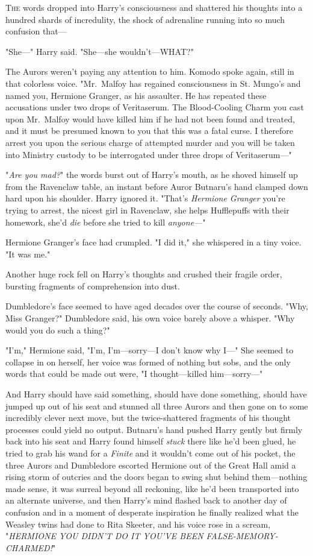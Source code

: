 
\lettrine{T}{he} words dropped into Harry's consciousness and shattered his thoughts into a 
hundred shards of incredulity, the shock of adrenaline running into so much 
confusion that---

"She---" Harry said. "She---she wouldn't---WHAT?"

The Aurors weren't paying any attention to him. Komodo spoke again, still in 
that colorless voice. "Mr.~Malfoy has regained consciousness in St. Mungo's and 
named you, Hermione Granger, as his assaulter. He has repeated these 
accusations under two drops of Veritaserum. The Blood-Cooling Charm you cast 
upon Mr.~Malfoy would have killed him if he had not been found and treated, and 
it must be presumed known to you that this was a fatal curse. I therefore 
arrest you upon the serious charge of attempted murder and you will be taken 
into Ministry custody to be interrogated under three drops of Veritaserum---"

"\emph{Are you mad?}" the words burst out of Harry's mouth, as he shoved 
himself up from the Ravenclaw table, an instant before Auror Butnaru's hand 
clamped down hard upon his shoulder. Harry ignored it. "That's \emph{Hermione 
Granger} you're trying to arrest, the nicest girl in Ravenclaw, she helps 
Hufflepuffs with their homework, she'd \emph{die} before she tried to kill 
\emph{anyone---}"

Hermione Granger's face had crumpled. "I did it," she whispered in a tiny 
voice. "It was me."

Another huge rock fell on Harry's thoughts and crushed their fragile order, 
bursting fragments of comprehension into dust.

Dumbledore's face seemed to have aged decades over the course of seconds. "Why, 
Miss Granger?" Dumbledore said, his own voice barely above a whisper. "Why 
would you do such a thing?"

"I'm," Hermione said, "I'm, I'm---sorry---I don't know why I---" She seemed to 
collapse in on herself, her voice was formed of nothing but sobs, and the only 
words that could be made out were, "I thought---killed him---sorry---"

And Harry should have said something, should have done something, should have 
jumped up out of his seat and stunned all three Aurors and then gone on to some 
incredibly clever next move, but the twice-shattered fragments of his thought 
processes could yield no output. Butnaru's hand pushed Harry gently but firmly 
back into his seat and Harry found himself \emph{stuck} there like he'd been 
glued, he tried to grab his wand for a \emph{Finite} and it wouldn't come out 
of his pocket, the three Aurors and Dumbledore escorted Hermione out of the 
Great Hall amid a rising storm of outcries and the doors began to swing shut 
behind them---nothing made sense, it was surreal beyond all reckoning, like 
he'd been transported into an alternate universe, and then Harry's mind flashed 
back to another day of confusion and in a moment of desperate inspiration he 
finally realized what the Weasley twins had done to Rita Skeeter, and his voice 
rose in a scream, "\emph{HERMIONE YOU DIDN'T DO IT YOU'VE BEEN 
FALSE-MEMORY-CHARMED!}"

